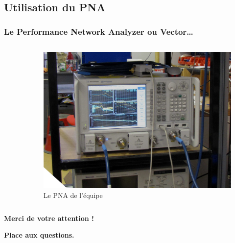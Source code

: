 \documentclass[10pt,a9paper,handout]{beamer} \usepackage[utf8]{inputenc} \usepackage[francais]{babel} \usepackage[T1]{fontenc}
\begin{document}
\subsection{Utilisation du PNA}
\begin{frame}
\frametitle{Le Performance Network Analyzer \tiny{ ou Vector…} }
\begin{columns}
\begin{column}{0.6\textwidth}
    \begin{description}
        \item[]~\\
    \end{description}
\end{column}
\begin{column}{0.4\textwidth}
\begin{figure}[h]
    \begin{center}
        \includegraphics[width=\textwidth]{Images/VNA}
        \caption{Le PNA de l’équipe}
    \end{center}
\end{figure}
\end{column}
\end{columns}
\end{frame}



\begin{frame}
    \begin{LARGE}
    \begin{center}
    \textbf{Merci de votre attention !}
    \vspace{0.5cm}
    
    \textbf{Place aux questions.}
    \end{center}
    \end{LARGE}
\end{frame}
\end{document}
